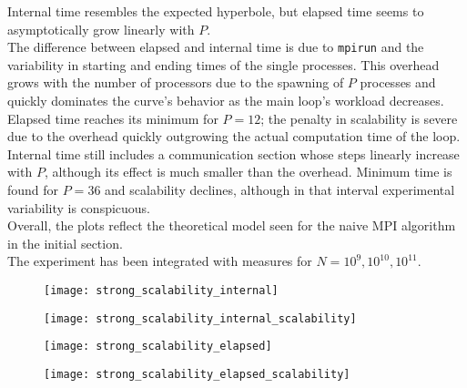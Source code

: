 \documentclass[a4paper, 11pt]{article}
\DeclarePairedDelimiter{\floor}{\lfloor}{\rfloor}
\begin{document}
Internal time resembles the expected hyperbole, but elapsed time seems to asymptotically grow linearly with $P$.\\
The difference between elapsed and internal time is due to \texttt{mpirun} and the variability in starting and ending times of the single processes. This overhead grows with the number of processors due to the spawning of $P$ processes and quickly dominates the curve's behavior as the main loop's workload decreases.\\
Elapsed time reaches its minimum for $P=12$; the penalty in scalability is severe due to the overhead quickly outgrowing the actual computation time of the loop.\\
Internal time still includes a communication section whose steps linearly increase with $P$, although its effect is much smaller than the overhead. Minimum time is found for $P=36$ and scalability declines, although in that interval experimental variability is conspicuous.\\
Overall, the plots reflect the theoretical model seen for the naive MPI algorithm in the initial section.\\
The experiment has been integrated with measures for $N=10^{9}, 10^{10}, 10^{11}$.
\begin{figure}[h]
\centering
\begin{minipage}{.5\textwidth}
  \centering
  \texttt{[image: strong\_scalability\_internal]}
  \label{fig:strong_scalability_internal}
\end{minipage}%
\begin{minipage}{.5\textwidth}
  \centering
  \texttt{[image: strong\_scalability\_internal\_scalability]}
  \label{fig:strong_scalability_internal_scalability}
\end{minipage}
\end{figure}
\begin{figure}[h]
\centering
\begin{minipage}{.5\textwidth}
  \centering
  \texttt{[image: strong\_scalability\_elapsed]}
  \label{fig:strong_scalability_elapsed}
\end{minipage}%
\begin{minipage}{.5\textwidth}
  \centering
  \texttt{[image: strong\_scalability\_elapsed\_scalability]}
  \label{fig:strong_scalability_elapsed_scalability}
\end{minipage}
\end{figure}
\end{document}
